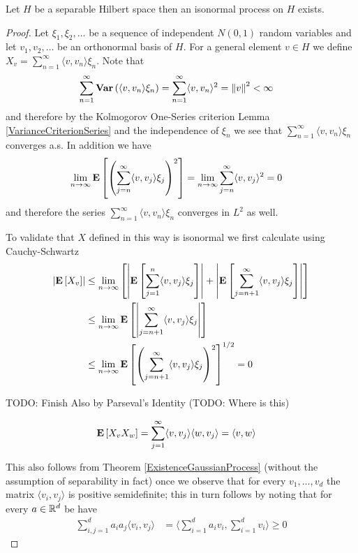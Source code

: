 \begin{prop}\label{ExistenceIsonormalProcess}Let $H$ be a separable Hilbert space then an isonormal process on $H$ exists.
\end{prop}
\begin{proof}
Let $\xi_1, \xi_2, \dotsc$ be a sequence of independent $N(0,1)$ random variables and let $v_1, v_2, \dotsc$ be an orthonormal basis of $H$.  For a general element $v \in H$ we define 
$X_v = \sum_{n=1}^\infty \langle v, v_n \rangle \xi_n$.  Note that 
\begin{align*}
\sum_{n=1}^\infty \textbf{Var} \left (\langle v, v_n \rangle \xi_n \right ) 
&= \sum_{n=1}^\infty  \langle v, v_n \rangle^2 = \left \lVert v \right \rVert^2 < \infty
\end{align*}
and therefore by the Kolmogorov One-Series criterion Lemma \ref{VarianceCriterionSeries} and the independence of $\xi_n$ we see that $\sum_{n=1}^\infty \langle v, v_n \rangle \xi_n$ converges a.s.  In addition we have 
\begin{align*}
\lim_{n \to \infty} \textbf{E}\left[\left( \sum_{j=n}^\infty \langle v, v_j \rangle \xi_j \right)^2\right] 
&=\lim_{n \to \infty} \sum_{j=n}^\infty \langle v, v_j \rangle^2 = 0
\end{align*}
and therefore the series $\sum_{n=1}^\infty \langle v, v_n \rangle \xi_n$ converges in $L^2$ as well.

To validate that $X$ defined in this way is isonormal we first calculate using Cauchy-Schwartz
\begin{align*}
\left \vert \textbf{E}\left[X_v\right]  \right \vert
&\leq \lim_{n \to \infty} \left[\left \vert \textbf{E}\left[\sum_{j=1}^n \langle v, v_j \rangle \xi_j\right] \right \vert + \left \vert \textbf{E}\left[\sum_{j=n+1}^\infty \langle v, v_j \rangle \xi_j\right] \right \vert \right] \\
&\leq \lim_{n \to \infty} \textbf{E}\left[\left \vert \sum_{j=n+1}^\infty \langle v, v_j \rangle \xi_j \right \vert\right] \\
&\leq \lim_{n \to \infty} \textbf{E}\left[\left( \sum_{j=n+1}^\infty \langle v, v_j \rangle \xi_j \right )^2\right]^{1/2} = 0 \\
\end{align*}

TODO: Finish
Also  by Parseval's Identity (TODO: Where is this)

\begin{align*}
\textbf{E}\left[X_v X_w\right] 
&= \sum_{j=1}^\infty \langle v, v_j \rangle \langle w, v_j \rangle = \langle v, w \rangle
\end{align*}

This also follows from Theorem \ref{ExistenceGaussianProcess} (without the assumption of separability in fact) once we observe that for every $v_1, \dotsc, v_d$ the matrix $\langle v_i, v_j \rangle$ is positive semidefinite; this in turn follows by noting that for every $a \in \mathbb{R}^d$ be have 
\begin{align*}
\sum_{i,j = 1}^d a_i a_j \langle v_i, v_j \rangle &= \langle \sum_{i=1}^d a_i v_i, \sum_{i=1}^d  v_i \rangle \geq 0
\end{align*}
\end{proof}

